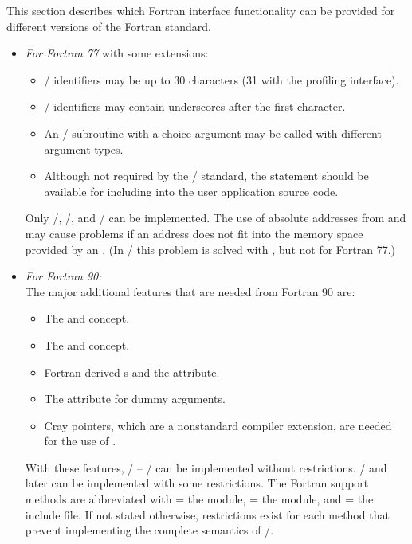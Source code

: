 This section describes which Fortran interface functionality
can be provided for different versions of the Fortran standard.
\begin{itemize}
\item
  \emph{For Fortran 77} with some extensions:
   \begin{itemize}
    \item \MPI/ identifiers may be up to 30 characters (31 with the
      profiling interface).
    \item \MPI/ identifiers may contain underscores after the first character.
    \item An \MPI/ subroutine with a choice argument may be
          called with different argument types.
    \item Although not required by the \MPI/ standard, the  statement
          should be available for including  into the
          user application source code.
   \end{itemize}
  Only \MPIIDOTI/, \MPIIDOTII/, and \MPIIDOTIII/ can be implemented.
  The use of absolute addresses from 
  and  may cause problems if an address does not
  fit into the memory space provided by an .
  (In \MPIIIDOTO/ this problem is solved with ,
   but not for Fortran 77.)
\item
  \emph{For Fortran 90:} \\
  The major additional features that are needed from Fortran 90 are:
   \begin{itemize}
   \item The  and  concept.
   \item The  and  concept.
   \item Fortran derived s and the  attribute.
   \item The  attribute for dummy arguments.
   \item Cray pointers, which are a nonstandard compiler extension,
         are needed for the use of .
   \end{itemize}
  With these features, \MPIIDOTI/ -- \MPIIIDOTII/ can be implemented
  without restrictions.
  \MPIIIIDOTO/ and later can be implemented with some restrictions.
  The Fortran support methods are abbreviated with
    = the  module,
    = the  module, and
    = the  include file.
  If not stated otherwise, restrictions exist for each method
  that prevent implementing the complete semantics of \MPI/.


\end{itemize}
